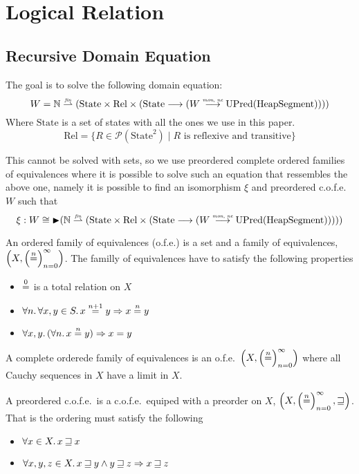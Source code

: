 \documentclass{article}
\newcommand{\finparfun}{\stackrel{\textit{\tiny{fin}}}{\rightharpoonup}}
\newcommand{\monnefun}{\stackrel{\textit{\tiny{mon, ne}}}{\longrightarrow}}
\newcommand{\fun}{\longrightarrow}
\newcommand{\nequal}[1][n]{\stackrel{\tiny{#1}}{=}}
\newcommand{\blater}{\mathop{\blacktriangleright}}
\newcommand{\powerset}[1]{\mathcal{P}(#1)}
\newcommand{\cofe}{c.o.f.e.}
\newcommand{\cofes}{\cofe{}'s}
\newcommand{\future}{\mathbin{\sqsupseteq}}
\newcommand{\plaindom}[1]{\mathrm{#1}}
\newcommand{\HeapSegments}{\plaindom{HeapSegment}}
\newcommand{\nats}{\mathbb{N}}
\newcommand{\Rel}{\plaindom{Rel}}
\newcommand{\States}{\plaindom{State}}
\newcommand{\UPred}[1]{\plaindom{UPred}(#1)}
\begin{document}
\section{Logical Relation}
\label{sec:logical-relation}
\subsection{Recursive Domain Equation}
\label{subsec:recursive-dom-eq}
The goal is to solve the following domain equation:
\[
W = \nats \finparfun (\States \times \Rel \times (\States \fun (W \monnefun \UPred{\HeapSegments})))
\]
Where $\States$ is a set of states with all the ones we use in this paper.
\[
\Rel= \{R \in \powerset{\States^2} \mid R \text{ is reflexive and transitive} \}
\]

This cannot be solved with sets, so we use preordered complete ordered families of equivalences where it is possible to solve such an equation that ressembles the above one, namely it is possible to find an isomorphism $\xi$ and preordered \cofe{} $W$ such that
\[
  \xi : W \cong \blater (\nats \finparfun (\States \times \Rel \times (\States \fun (W \monnefun \UPred{\HeapSegments}))))
\]

\begin{definition}[o.f.e's]
  An ordered family of equivalences (o.f.e.) is a set and a family of equivalences, $\left(X, \left(\nequal\right)_{n=0}^{\infty} \right)$. The familly of equivalences have to satisfy the following properties
  \begin{itemize}
  \item $\nequal[0]$ is a total relation on $X$
  \item $\forall n \ldotp \forall x,y \in S \ldotp x \nequal[n+1] y \Rightarrow x \nequal y$
  \item $\forall x,y \ldotp(\forall n \ldotp x \nequal y) \Rightarrow x=y$
  \end{itemize}
\end{definition}

\begin{definition}[\cofes]
  A complete orderede family of equivalences is an o.f.e.\ $\left(X, \left(\nequal\right)_{n=0}^{\infty} \right)$ where all Cauchy sequences in $X$ have a limit in $X$.
\end{definition}

\begin{definition}[Preordered \cofes]
  A preordered \cofe{}\ is a \cofe{}\ equiped with a preorder on $X$, $\left(X, \left(\nequal\right)_{n=0}^{\infty}, \future \right)$. That is the ordering must satisfy the following
  \begin{itemize}
  \item $\forall x \in X \ldotp x \future x$
  \item $\forall x,y,z \in X \ldotp x \future y \land y \future z \Rightarrow x \future z$
  \end{itemize}
\end{definition}
\end{document}
